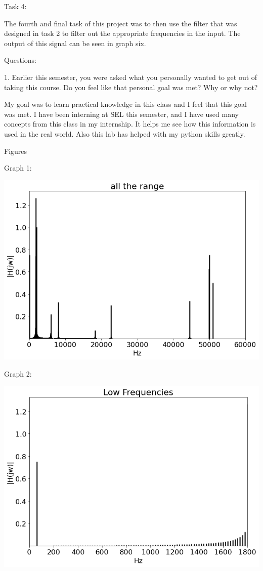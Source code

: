 \documentclass[nobib]{MSword}
\begin{document}
\begin{center}
    Task 4:
\end{center}
The fourth and final task of this project was to then use the filter that was designed in task 2 to filter out the appropriate frequencies in the input. The output of this signal can be seen in graph six.

\begin{center}
    Questions:
\end{center}

1. Earlier this semester, you were asked what you personally wanted to get out of taking this
course. Do you feel like that personal goal was met? Why or why not?

My goal was to learn practical knowledge in this class and I feel that this goal was met. I have been interning at SEL this semester, and I have used many concepts from this class in my internship. It helps me see how this information is used in the real world. Also this lab has helped with my python skills greatly.

\begin{center}
    Figures
\end{center}

Graph 1:

\includegraphics[scale = 0.6]
{txt/Lab12GraphAll.png}

Graph 2:

\includegraphics[scale = 0.6]
{txt/Lab12Graph2.png}
\end{document}
